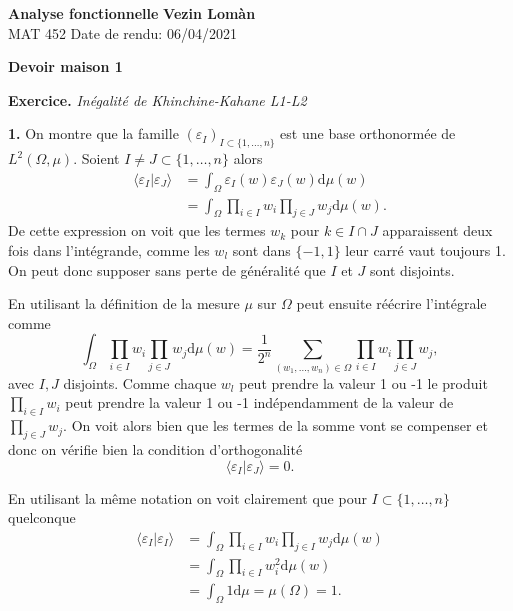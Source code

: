 \documentclass[12pt]{article}
\newcommand{\de}{\mathrm{d}}
\begin{document}
        \noindent
\textbf{Analyse fonctionnelle} \hfill \textbf{Vezin Lomàn}\\
\normalsize MAT 452 \hfill Date de rendu: 06/04/2021\\

\begin{center}
\textbf{Devoir maison 1}
\end{center}
      
\textbf{Exercice.} \textit{Inégalité de Khinchine-Kahane L1-L2}
\medskip

\textbf{1.} On montre que la famille $(\varepsilon_I)_{I \subset \{1, \ldots, n\}}$ est une base orthonormée de $L^{2}(\Omega, \mu)$. Soient $I \neq J \subset \{1, \ldots, n\}$ alors
\begin{align*}
        \langle \varepsilon_{I} | \varepsilon_{J} \rangle &= \int_{\Omega}\varepsilon_{I}(w)\varepsilon_{J}(w)\de \mu(w) \\
                                                          &= \int_{\Omega}\prod_{i\in I}w_{i}\prod_{j\in J}w_j \de\mu(w)
.\end{align*}
De cette expression on voit que les termes $w_{k}$ pour $k \in I \cap J$ apparaissent deux fois dans l'intégrande, comme les $w_{l}$ sont dans $\{-1, 1\}$ leur carré vaut toujours 1. On peut donc supposer sans perte de généralité que $I$ et $J$ sont disjoints. 

En utilisant la définition de la mesure $\mu$ sur $\Omega$ peut ensuite réécrire l'intégrale comme  \[
        \int_{\Omega}\prod_{i\in I}w_{i}\prod_{j\in J}w_j \de\mu(w) = \frac{1}{2^{n}}\sum_{(w_1, \ldots, w_{n}) \in \Omega} \prod_{i \in I}w_i \prod_{j \in J}w_j
,\] avec $I, J$ disjoints. Comme chaque $w_l$ peut prendre la valeur 1 ou -1 le produit $\prod_{i \in I}w_i$ peut prendre la valeur 1 ou -1 indépendamment de la valeur de $\prod_{j \in J}w_j$. On voit alors bien que les termes de la somme vont se compenser et donc on vérifie bien la condition d'orthogonalité  \[
\langle \varepsilon_{I} | \varepsilon_{J} \rangle = 0
.\] 

En utilisant la même notation on voit clairement que pour $I \subset \{1, \ldots, n\} $ quelconque
\begin{align*}
        \langle \varepsilon_{I} | \varepsilon_{I} \rangle &= \int_{\Omega}\prod_{i\in I}w_{i}\prod_{j\in I}w_j \de\mu(w) \\
                                                          &= \int_{\Omega}\prod_{i\in I}w_{i}^{2}\de\mu(w) \\
                                                          &= \int_{\Omega}1\de\mu = \mu(\Omega) = 1
.\end{align*} 
\end{document}
